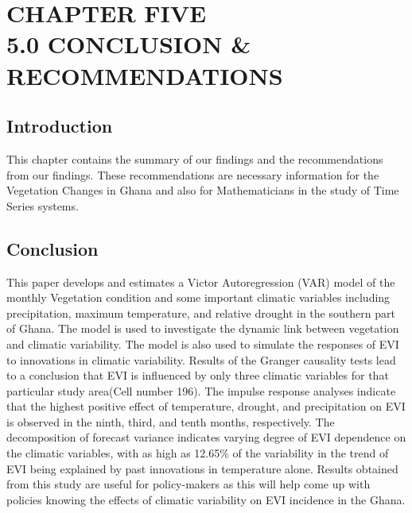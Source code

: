  \chapter{CHAPTER FIVE\\5.0 CONCLUSION \& RECOMMENDATIONS}
\label{Chapter5}
\section{Introduction}
This chapter contains the summary of our findings and the recommendations from our findings. These recommendations are necessary information for the Vegetation Changes in Ghana and also for Mathematicians in the study of Time Series systems.

\section{Conclusion}
This paper develops and estimates a Victor Autoregression (VAR) model of the monthly Vegetation condition and some
important climatic variables including precipitation, maximum temperature, and relative drought in the southern part of Ghana. The model is used to investigate the dynamic link  between vegetation and climatic variability. The model is also used to simulate the responses of EVI to innovations in climatic variability.
Results of the Granger causality tests lead to a conclusion that EVI is influenced by only three climatic variables for that particular study area(Cell number 196). The impulse response analyses indicate that the highest positive effect of  temperature, drought, and precipitation on EVI is observed in the ninth, third, and tenth months, respectively. The decomposition of forecast variance indicates varying degree of EVI dependence on the climatic variables, with as high as 12.65\% of the variability in the trend of EVI being explained by past innovations in  temperature alone. Results obtained from this study are useful for policy-makers as this will help come up with policies knowing the effects of climatic variability on EVI incidence in the Ghana.

